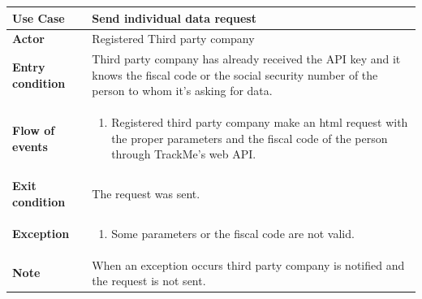 \documentclass[../main.tex]{subfiles}
\begin{document}
	\vspace*{3cm}
	\begin{center}
		\begin{tabular}{p{3cm}p{8.28cm}}
			\hline
			\textbf{Use Case} & Send individual data request\\
			\hline
			\textbf{Actor} & Registered Third party company\\
			\hline
			\textbf{Entry condition} & Third party company has already received the API key and it knows the fiscal code or the social security number of the person to whom it's asking for data.\\
			\hline
			\textbf{Flow of events} & \begin{enumerate}
				\linespread{0}\item Registered third party company make an html request with the proper parameters and the fiscal code of the person through TrackMe's web API.
			\end{enumerate}\\
			\hline
			\textbf{Exit condition} & The request was sent.\\
			\hline
			\textbf{Exception} & \begin{enumerate}
				\linespread{0}\item Some parameters or the fiscal code are not valid.
			\end{enumerate}\\
			\hline
			\textbf{Note} & When an exception occurs third party company is notified and the request is not sent.\\
			\hline
		\end{tabular}
	\end{center}
\end{document}
